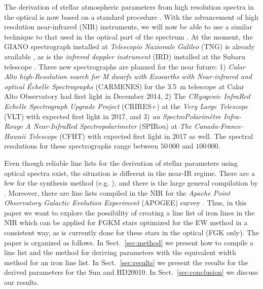 \documentclass{aa}
\begin{document}
The derivation of stellar atmospheric parameters from high
resolution spectra in the optical is now based on a standard
procedure \citep[see e.g.][]{Valenti2005,Sousa2008a}. With the
advancement of high resolution near-infrared (NIR) instruments, we will now be able to use a similar
technique to that used in the optical part of the spectrum
\citep[see e.g.][]{Melendez1999,Sousa2008a,Tsantaki2013,Mucciarelli2013,Bensby2014}.
At the moment, the GIANO spectrograph installed at \emph{Telescopio Nazionale Galileo} (TNG) is already
available \citep{GIANO}, as is the \emph{infrered doppler instrument} (IRD) installed
at the Subaru telescope \citep{IRD}. Three new spectrographs are planned for the
near future: 1) \emph{Calar Alto high-Resolution search for M dwarfs with Exoearths with
Near-infrared and optical Échelle Spectrographs} (CARMENES) for the \SI{3.5}{m} telescope at Calar Alto
Observatory \citep{CARMENES} had first light in December 2014,
2) The \emph{CRyogenic InfraRed Echelle Spectrograph Upgrade Project} (CRIRES+) at the
\emph{Very Large Telescope} (VLT) \citep{CRIRESp} with expected first light in 2017,
and 3) \emph{un SpectroPolarimètre Infra-Rouge
A Near-InfraRed Spectropolarimeter} (SPIRou) at \emph{The Canada-France-Hawaii Telescope} (CFHT) \citep{SPIROU1,SPIROU2} with expected first light
in 2017 as well. The spectral resolutions for these spectrographs range
between $50\,000$ and $100\,000$.

Even though reliable line lists for the derivation of stellar parameters
using optical spectra exist, the situation is different in the near-IR
regime. There are a few for the synthesis method (e.g. \citet{Onehag2012,Origlia2013,Rhodin2015}),
 and there is  the large general compilation by
\citet{Melendez1999}. Moreover, there are line lists compiled
in the NIR for the \emph{Apache Point Observatory Galactic Evolution Experiment} (APOGEE) survey \citep[see e.g.][]{Smith2013,Shetrone2015}.
Thus, in this paper we want to explore the
possibility of creating a line list of iron lines in the NIR which can
be applied for FGKM stars optimized for the EW method in a consistent
way, as is currently done for these stars in the optical (FGK
only). The paper is organized as follows. In Sect.~\ref{sec:method}
we present how to compile a line list and the method for deriving
parameters with the equivalent width method for an iron line list.
In Sect.~\ref{sec:results} we present the results for the derived
parameters for the Sun and HD20010. In
Sect.~\ref{sec:conclusion}  we discuss our results.
\end{document}
